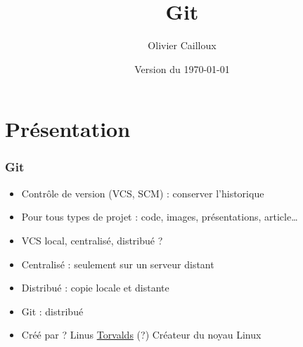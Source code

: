 \documentclass[english, french]{beamer}
\title{Git}
\author{Olivier Cailloux}
\institute[LAMSADE]{LAMSADE, Université Paris-Dauphine}
\date{Version du \today}
\begin{document}


\begin{frame}[plain]
   \titlepage
\end{frame}
\addtocounter{framenumber}{-1}

\section{Présentation}
\begin{frame}
	\frametitle{Git}
	\begin{itemize}
		\item Contrôle de version (VCS, SCM) : conserver l’historique
		\item Pour tous types de projet : code, images, présentations, article…
		\item VCS local, centralisé, distribué ? \pause
		\item Centralisé : seulement sur un serveur distant
		\item Distribué : copie locale et distante
		\item Git : distribué
		\item Créé par ? \pause Linus \href{https://en.wikipedia.org/wiki/Linus_Torvalds}{Torvalds} (?) \pause Créateur du noyau Linux
	\end{itemize}
\end{frame}
\end{document}
